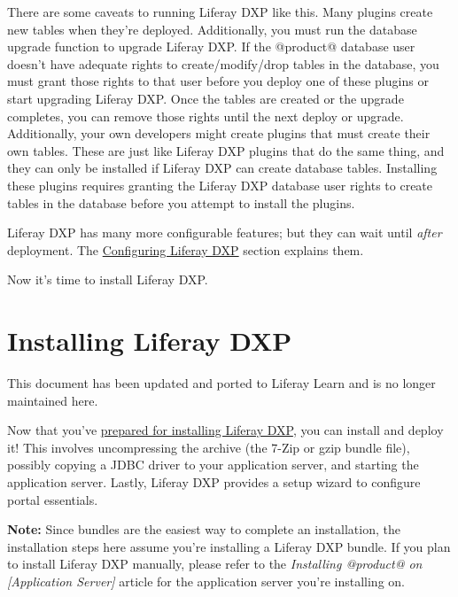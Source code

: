 There are some caveats to running Liferay DXP like this. Many plugins
create new tables when they're deployed. Additionally, you must run the
database upgrade function to upgrade Liferay DXP. If the @product@
database user doesn't have adequate rights to create/modify/drop tables
in the database, you must grant those rights to that user before you
deploy one of these plugins or start upgrading Liferay DXP. Once the
tables are created or the upgrade completes, you can remove those rights
until the next deploy or upgrade. Additionally, your own developers
might create plugins that must create their own tables. These are just
like Liferay DXP plugins that do the same thing, and they can only be
installed if Liferay DXP can create database tables. Installing these
plugins requires granting the Liferay DXP database user rights to create
tables in the database before you attempt to install the plugins.

Liferay DXP has many more configurable features; but they can wait until
\emph{after} deployment. The
\href{/docs/7-2/deploy/-/knowledge_base/d/configuring-product}{Configuring
Liferay DXP} section explains them.

Now it's time to install Liferay DXP.

\chapter{Installing Liferay DXP}\label{installing-liferay-dxp}

{This document has been updated and ported to Liferay Learn and is no
longer maintained here.}

Now that you've
\href{/docs/7-2/deploy/-/knowledge_base/d/preparing-for-install}{prepared
for installing Liferay DXP}, you can install and deploy it! This
involves uncompressing the archive (the 7-Zip or gzip bundle file),
possibly copying a JDBC driver to your application server, and starting
the application server. Lastly, Liferay DXP provides a setup wizard to
configure portal essentials.

\noindent\hrulefill

\textbf{Note:} Since bundles are the easiest way to complete an
installation, the installation steps here assume you're installing a
Liferay DXP bundle. If you plan to install Liferay DXP manually, please
refer to the \emph{Installing @product@ on {[}Application Server{]}}
article for the application server you're installing on.

\noindent\hrulefill

